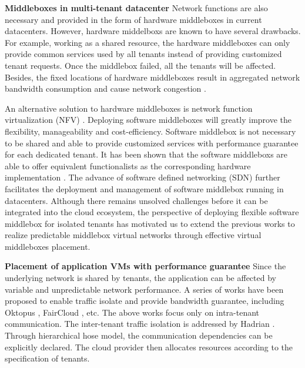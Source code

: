 \documentclass[review]{elsarticle}
\begin{document}
\textbf{Middleboxes in multi-tenant datacenter }
Network functions are also necessary and provided in the form of hardware middleboxes in current datacenters.  However, hardware middelboxs are known to have several drawbacks. For example, working as a shared resource, the hardware middleboxes can only provide common services used by all tenants instead of providing customized tenant requests. Once the middlebox failed, all the tenants will be affected. Besides, the fixed locations of hardware middleboxes result in aggregated network bandwidth consumption and cause network congestion \cite{ClickOS, Y15NFV}. 

An alternative solution to hardware middleboxes is network function virtualization (NFV) \cite{NFV}. Deploying software middleboxes will greatly improve the flexibility, manageability and cost-efficiency. Software middlebox is not necessary to be shared and able to provide customized services with performance guarantee for each dedicated tenant. It has been shown that the software middleboxs are able to offer equivalent functionalists as the corresponding hardware implementation \cite{D12tpp, S12dai, G13dio, ClickOS}. The advance of software defined networking (SDN) further facilitates the deployment and management of software middlebox running in datacenters. Although there remains unsolved challenges before it can be integrated into the cloud ecosystem, the perspective of deploying flexible software middlebox for isolated tenants has motivated us to extend the previous works to realize predictable middlebox virtual networks through effective virtual middleboxes placement.


\textbf{Placement of application VMs with performance guarantee}
Since the underlying network is shared by tenants, the application can be affected by variable and unpredictable network performance. A series of works have been proposed to enable traffic isolate and provide bandwidth guarantee, including Oktopus \cite{B11tpd}, FairCloud \cite{P12fst}, etc. The above works focus only on intra-tenant communication. The inter-tenant traffic isolation is addressed by Hadrian \cite{B13cta}. Through hierarchical hose model, the communication dependencies can be explicitly declared. The cloud provider then allocates resources according to the specification of tenants. 
\end{document}
